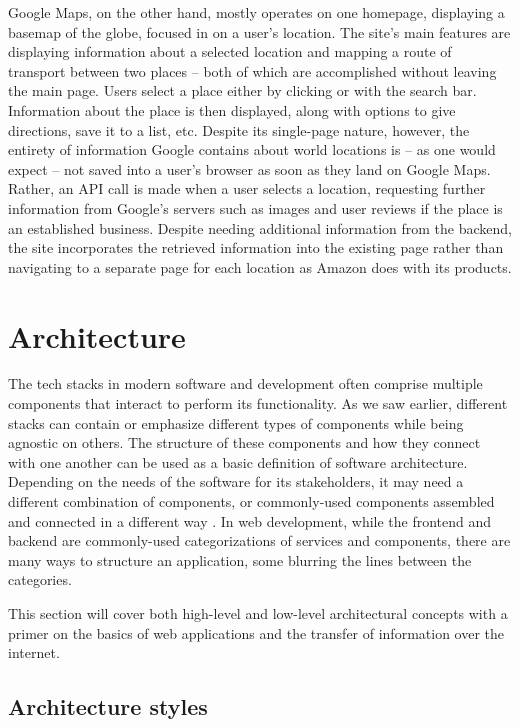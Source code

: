Google Maps, on the other hand, mostly operates on one homepage, displaying a basemap of the globe, focused in on a user's location. The site's main features are displaying information about a selected location and mapping a route of transport between two places -- both of which are accomplished without leaving the main page. Users select a place either by clicking or with the search bar. Information about the place is then displayed, along with options to give directions, save it to a list, etc. Despite its single-page nature, however, the entirety of information Google contains about world locations is -- as one would expect -- not saved into a user's browser as soon as they land on Google Maps. Rather, an API call is made when a user selects a location, requesting further information from Google's servers such as images and user reviews if the place is an established business. Despite needing additional information from the backend, the site incorporates the retrieved information into the existing page rather than navigating to a separate page for each location as Amazon does with its products.

\section{Architecture}

The tech stacks in modern software and development often comprise multiple components that interact to perform its functionality. As we saw earlier, different stacks can contain or emphasize different types of components while being agnostic on others. The structure of these components and how they connect with one another can be used as a basic definition of software architecture. Depending on the needs of the software for its stakeholders, it may need a different combination of components, or commonly-used components assembled and connected in a different way \cite{ghidersa_software_2022}. In web development, while the frontend and backend are commonly-used categorizations of services and components, there are many ways to structure an application, some blurring the lines between the categories.

This section will cover both high-level and low-level architectural concepts with a primer on the basics of web applications and the transfer of information over the internet.

\subsection{Architecture styles}

